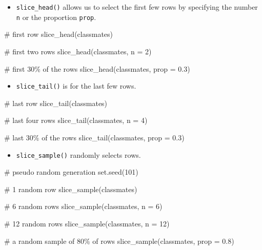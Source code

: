 \documentclass[
  letterpaper,
  DIV=11,
  numbers=noendperiod]{scrreprt}
\newenvironment{Shaded}{\begin{snugshade}}{\end{snugshade}}
\newcommand{\AttributeTok}[1]{\textcolor[rgb]{0.40,0.45,0.13}{#1}}
\newcommand{\CommentTok}[1]{\textcolor[rgb]{0.37,0.37,0.37}{#1}}
\newcommand{\DecValTok}[1]{\textcolor[rgb]{0.68,0.00,0.00}{#1}}
\newcommand{\FloatTok}[1]{\textcolor[rgb]{0.68,0.00,0.00}{#1}}
\newcommand{\FunctionTok}[1]{\textcolor[rgb]{0.28,0.35,0.67}{#1}}
\newcommand{\NormalTok}[1]{\textcolor[rgb]{0.00,0.23,0.31}{#1}}
\providecommand{\tightlist}{%
  \setlength{\itemsep}{0pt}\setlength{\parskip}{0pt}}\usepackage{longtable,booktabs,array}
\begin{document}
\begin{itemize}
\tightlist
\item
  \texttt{slice\_head()} allows us to select the first few rows by
  specifying the number \texttt{n} or the proportion \texttt{prop}.
\end{itemize}

\begin{Shaded}
\begin{Highlighting}[]
\CommentTok{\# first row}
\FunctionTok{slice\_head}\NormalTok{(classmates)}

\CommentTok{\# first two rows}
\FunctionTok{slice\_head}\NormalTok{(classmates, }\AttributeTok{n =} \DecValTok{2}\NormalTok{)}

\CommentTok{\# first 30\% of the rows}
\FunctionTok{slice\_head}\NormalTok{(classmates, }\AttributeTok{prop =} \FloatTok{0.3}\NormalTok{)}
\end{Highlighting}
\end{Shaded}

\begin{itemize}
\tightlist
\item
  \texttt{slice\_tail()} is for the last few rows.
\end{itemize}

\begin{Shaded}
\begin{Highlighting}[]
\CommentTok{\# last row}
\FunctionTok{slice\_tail}\NormalTok{(classmates)}

\CommentTok{\# last four rows}
\FunctionTok{slice\_tail}\NormalTok{(classmates, }\AttributeTok{n =} \DecValTok{4}\NormalTok{)}

\CommentTok{\# last 30\% of the rows}
\FunctionTok{slice\_tail}\NormalTok{(classmates, }\AttributeTok{prop =} \FloatTok{0.3}\NormalTok{)}
\end{Highlighting}
\end{Shaded}

\begin{itemize}
\tightlist
\item
  \texttt{slice\_sample()} randomly selects rows.
\end{itemize}

\begin{Shaded}
\begin{Highlighting}[]
\CommentTok{\# pseudo random generation}
\FunctionTok{set.seed}\NormalTok{(}\DecValTok{101}\NormalTok{)}

\CommentTok{\# 1 random row}
\FunctionTok{slice\_sample}\NormalTok{(classmates)}

\CommentTok{\# 6 random rows}
\FunctionTok{slice\_sample}\NormalTok{(classmates, }\AttributeTok{n =} \DecValTok{6}\NormalTok{)}

\CommentTok{\# 12 random rows}
\FunctionTok{slice\_sample}\NormalTok{(classmates, }\AttributeTok{n =} \DecValTok{12}\NormalTok{)}

\CommentTok{\# a random sample of 80\% of rows}
\FunctionTok{slice\_sample}\NormalTok{(classmates, }\AttributeTok{prop =} \FloatTok{0.8}\NormalTok{)}
\end{Highlighting}
\end{Shaded}
\end{document}
